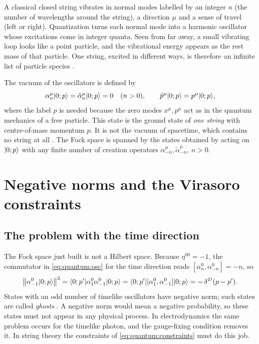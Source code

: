 \begin{physicsbox}
A classical closed string vibrates in normal modes labelled by an integer $n$ (the number of
wavelengths around the string), a direction $\mu$ and a sense of travel (left or right).
Quantization turns each normal mode into a harmonic oscillator whose excitations come in
integer quanta. Seen from far away, a small vibrating loop looks like a point particle, and
the vibrational energy appears as the rest mass of that particle. One string, excited in
different ways, is therefore an infinite list of particle species
.
\end{physicsbox}

The vacuum of the oscillators is defined by
\begin{equation}\label{eq:quantum:vacuum}
 \alpha^\mu_n|0;p\rangle=\tilde\alpha^\mu_n|0;p\rangle=0\quad(n>0),\qquad
 \hat p^\mu|0;p\rangle=p^\mu|0;p\rangle,
\end{equation}
where the label $p$ is needed because the zero modes $x^\mu,p^\mu$ act as in the quantum
mechanics of a free particle. This state is the ground state of \emph{one string} with
centre-of-mass momentum $p$. It is not the vacuum of spacetime, which contains no string at
all . The Fock space is spanned by the
states obtained by acting on $|0;p\rangle$ with any finite number of creation operators
$\alpha^\mu_{-n},\tilde\alpha^\mu_{-n}$, $n>0$.

\section{Negative norms and the Virasoro constraints}\label{sec:quantum:virasoro}

\subsection{The problem with the time direction}

The Fock space just built is not a Hilbert space. Because $\eta^{00}=-1$, the commutator
in \cref{eq:quantum:osc} for the time direction reads $[\alpha^0_n,\alpha^0_{-n}]=-n$, so
\begin{equation}\label{eq:quantum:negnorm}
 \big\|\alpha^0_{-1}|0;p\rangle\big\|^2=\langle 0;p'|\alpha^0_1\alpha^0_{-1}|0;p\rangle
   =\langle 0;p'|[\alpha^0_1,\alpha^0_{-1}]|0;p\rangle=-\,\delta^D(p-p') .
\end{equation}
States with an odd number of timelike oscillators have negative norm; such states are called
\emph{ghosts} . A
negative norm would mean a negative probability, so these states must not appear in any
physical process. In electrodynamics the same problem occurs for the timelike photon, and
the gauge-fixing condition removes it. In string theory the constraints of
\cref{eq:quantum:constraints} must do this job.


